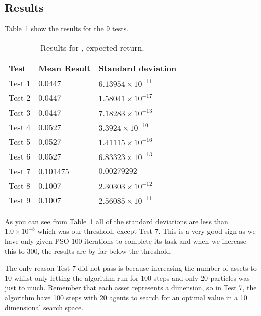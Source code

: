     \subsection{Results} %
    \label{sub:results}
      Table~\ref{table:expected_results} show the results for the 9 tests.
        \begin{table}[H]
          \setlength{\extrarowheight}{2.0pt}
          \begin{tabular}{|l|l|l|}
            \hline
            Test & Mean Result & Standard deviation \\
            \hline
            Test 1 & 0.0447 & $6.13954\times10^{-11}$ \\
            \hline
            Test 2 & 0.0447 & $1.58041\times10^{-17}$ \\
            \hline
            Test 3 & 0.0447 & $7.18283\times10^{-13}$ \\
            \hline
            Test 4 & 0.0527 & $3.3924\times10^{-10}$ \\
            \hline
            Test 5 & 0.0527 & $1.41115\times10^{-16}$ \\
            \hline
            Test 6 & 0.0527 & $6.83323\times10^{-13}$ \\
            \hline
            Test 7 & 0.101475 & $0.00279292$ \\
            \hline
            Test 8 & 0.1007 & $2.30303\times10^{-12}$ \\
            \hline
            Test 9 & 0.1007 & $2.56085\times10^{-11}$ \\
            \hline
          \end{tabular}
          \caption{Results for , expected return.}
          \label{table:expected_results}
        \end{table}
      As you can see from Table~\ref{table:expected_results} all of the standard deviations are less than $1.0\times10^{-8}$ which was our threshold, except Test 7. This is a very good sign as we have only given PSO 100 iterations to complete its task and when we increase this to 300, the results are by far below the threshold. 

      The only reason Test 7 did not pass is because increasing the number of assets to 10 whilst only letting the algorithm run for 100 steps and only 20 particles was just to much. Remember that each asset represents a dimension, so in Test 7, the algorithm have 100 steps with 20 agents to search for an optimal value in a 10 dimensional search space.

